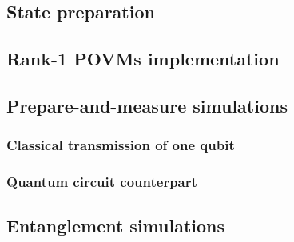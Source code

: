 \subsection{State preparation}

\subsection{Rank-1 POVMs implementation}

\subsection{Prepare-and-measure simulations}
\subsubsection{Classical transmission of one qubit}

\subsubsection{Quantum circuit counterpart}

\subsection{Entanglement simulations}
